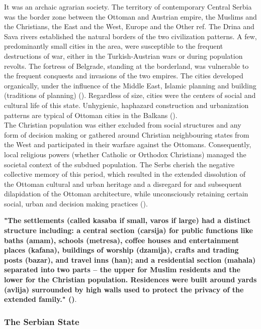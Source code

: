 \documentclass[11pt]{report}
\begin{document}
{{{{It was an archaic agrarian society. The territory of contemporary Central Serbia was the border zone between the Ottoman and Austrian empire, the Muslims and the Christians, the East and the West, Europe and the Other ref. The Drina and Sava rivers established the natural borders of the two civilization patterns. A few, predominantly small cities in the area, were susceptible to the frequent destructions of war, either in the Turkish-Austrian wars or during population revolts. The fortress of Belgrade, standing at the borderland, was vulnerable to the frequent conquests and invasions of the two empires. The cities developed organically, under the influence of the Middle East, Islamic planning and building (traditions
of planning) (\href{Nedovic}{\citealt{nedovicbudic_waves_2006}}). Regardless of size, cities were the centers of social and cultural life of this state. Unhygienic, haphazard construction and urbanization patterns are typical of Ottoman cities in the Balkans (\href{Kadijevic}{\citealt{kadijevic_jedan_2007}}). 
\\ 
The Christian population was either excluded from social structures and any form of decision making or gathered around Christian neighbouring states from the West and participated in their warfare against the Ottomans. Consequently, local religious powers (whether Catholic or Orthodox Christians) managed the societal context of the subdued population.
The Serbs cherish the negative collective memory of this period, which resulted in the extended dissolution of the Ottoman cultural and urban heritage and a disregard for and subsequent dilapidation of the Ottoman architecture, while unconsciously retaining certain social, urban and decision making practices (\href{Blagojevic}{\citealt{blagojevic_urban_2009}}).

\textbf{"The settlements (called kasaba if small, varos if large) had a distinct structure including: a central section (carsija) for public functions like baths (amam), schools (metresa), coffee houses and entertainment places (kafana), buildings of worship (dzamija), crafts and trading posts (bazar), and travel inns (han); and a residential section (mahala) separated into two parts – the upper for Muslim residents and the lower for the Christian population. Residences were built around yards (avlija) surrounded by high walls used to protect the privacy of the extended family." (\href{Nedovic}{\citealt{nedovicbudic_waves_2006}})}.
 
\subsubsection{The Serbian State}

}}}}
\end{document}
